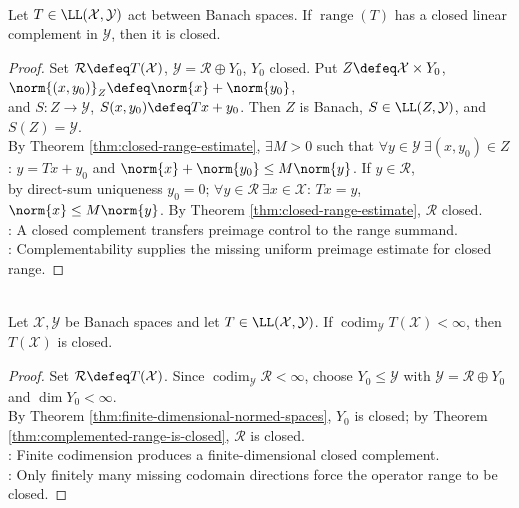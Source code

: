 \begin{theorem} \label{thm:complemented-range-is-closed} \\
Let $T\in\LL(\mathcal{X},\mathcal{Y})$ act between Banach spaces. If $\operatorname{range}(T)$ has a closed linear complement in $\mathcal{Y}$, then it is closed.
\begin{proof} Set $\mathcal R\defeq T(\mathcal X)$, $\mathcal Y=\mathcal R\oplus Y_0$, $Y_0$ closed. Put $Z\defeq\mathcal X\times Y_0$, $\norm{(x,y_0)}_Z\defeq\norm{x}+\norm{y_0}$,\\
and $S:Z\to\mathcal Y$, $S(x,y_0)\defeq Tx+y_0$. Then $Z$ is Banach, $S\in\LL(Z,\mathcal Y)$, and $S(Z)=\mathcal Y$.\\
By Theorem \ref{thm:closed-range-estimate}, $\exists M>0$ such that $\forall y\in\mathcal Y\ \exists(x,y_0)\in Z$: $y=Tx+y_0$ and $\norm{x}+\norm{y_0}\leq M\norm{y}$. If $y\in\mathcal R$,\\
by direct-sum uniqueness $y_0=0$; $\forall y\in\mathcal R\ \exists x\in\mathcal X$: $Tx=y$, $\norm{x}\leq M\norm{y}$. By Theorem \ref{thm:closed-range-estimate}, $\mathcal R$ closed.\\
: A closed complement transfers preimage control to the range summand.\\
: Complementability supplies the missing uniform preimage estimate for closed range.
\end{proof}
\end{theorem}

\begin{corollary} \label{cor:finite-codimensional-operator-range-closed} \\
Let $\mathcal{X},\mathcal{Y}$ be Banach spaces and let $T\in\LL(\mathcal{X},\mathcal{Y})$. If $\operatorname{codim}_{\mathcal{Y}}T(\mathcal{X})<\infty$, then $T(\mathcal{X})$ is closed.
\begin{proof}
Set $\mathcal R\defeq T(\mathcal X)$. Since $\operatorname{codim}_{\mathcal Y}\mathcal R<\infty$, choose $Y_0\leq\mathcal Y$ with $\mathcal Y=\mathcal R\oplus Y_0$ and $\dim Y_0<\infty$.\\
By Theorem \ref{thm:finite-dimensional-normed-spaces}, $Y_0$ is closed; by Theorem \ref{thm:complemented-range-is-closed}, $\mathcal R$ is closed.\\
: Finite codimension produces a finite-dimensional closed complement.\\
: Only finitely many missing codomain directions force the operator range to be closed.
\end{proof}
\end{corollary}
